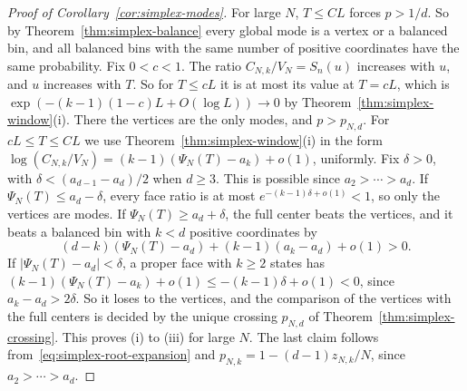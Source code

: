 \begin{proof}[Proof of Corollary~\ref{cor:simplex-modes}]
For large $N$, $T\le CL$ forces $p>1/d$. So by Theorem~\ref{thm:simplex-balance}
every global mode is a vertex or a balanced bin, and all balanced bins with the
same number of positive coordinates have the same probability. Fix $0<c<1$. The
ratio $C_{N,k}/V_N=S_n(u)$ increases with $u$, and $u$ increases with $T$. So for
$T\le cL$ it is at most its value at $T=cL$, which is
$\exp(-(k-1)(1-c)L+O(\log L))\to0$ by Theorem~\ref{thm:simplex-window}(i). There
the vertices are the only modes, and $p>p_{N,d}$. For $cL\le T\le CL$ we use
Theorem~\ref{thm:simplex-window}(i) in the form
$\log(C_{N,k}/V_N)=(k-1)(\Psi_N(T)-a_k)+o(1)$, uniformly. Fix $\delta>0$, with
$\delta<(a_{d-1}-a_d)/2$ when $d\ge3$. This is possible since $a_2>\cdots>a_d$.
If $\Psi_N(T)\le a_d-\delta$, every face ratio is at most
$e^{-(k-1)\delta+o(1)}<1$, so only the vertices are modes. If
$\Psi_N(T)\ge a_d+\delta$, the full center beats the vertices, and it beats a
balanced bin with $k<d$ positive coordinates by
\[
(d-k)(\Psi_N(T)-a_d)+(k-1)(a_k-a_d)+o(1)>0 .
\]
If $|\Psi_N(T)-a_d|<\delta$, a proper face with $k\ge2$ states has
$(k-1)(\Psi_N(T)-a_k)+o(1)\le-(k-1)\delta+o(1)<0$, since $a_k-a_d>2\delta$. So it
loses to the vertices, and the comparison of the vertices with the full centers
is decided by the unique crossing $p_{N,d}$ of Theorem~\ref{thm:simplex-crossing}.
This proves (i) to (iii) for large $N$. The last claim follows
from~\eqref{eq:simplex-root-expansion} and $p_{N,k}=1-(d-1)z_{N,k}/N$, since
$a_2>\cdots>a_d$.
\end{proof}
